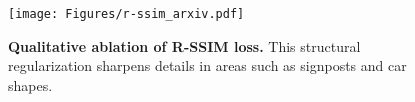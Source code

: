 \begin{figure}[!t]
\centering
   \texttt{[image: Figures/r-ssim\_arxiv.pdf]}
   \caption{\textbf{Qualitative ablation of R-SSIM loss.}
    This structural regularization sharpens details in areas such as signposts and car shapes.
   } 
\label{fig:r-ssim}
\end{figure}